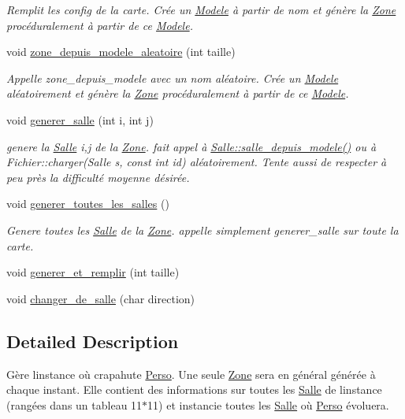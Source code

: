 \begin{DoxyCompactItemize}
\begin{DoxyCompactList}\small\item\em Remplit les {\itshape config} de la {\itshape carte}. Crée un \hyperlink{classModele}{Modele} à partir de {\itshape nom} et génère la \hyperlink{classZone}{Zone} procéduralement à partir de ce \hyperlink{classModele}{Modele}. \end{DoxyCompactList}\item 
void \hyperlink{classZone_a64b87f18b343a38b40a2fbf9220b3994}{zone\+\_\+depuis\+\_\+modele\+\_\+aleatoire} (int taille)
\begin{DoxyCompactList}\small\item\em Appelle zone\+\_\+depuis\+\_\+modele avec un nom aléatoire. Crée un \hyperlink{classModele}{Modele} aléatoirement et génère la \hyperlink{classZone}{Zone} procéduralement à partir de ce \hyperlink{classModele}{Modele}. \end{DoxyCompactList}\item 
void \hyperlink{classZone_a2a149ff3989dbe48c1dd1822f158da8e}{generer\+\_\+salle} (int i, int j)
\begin{DoxyCompactList}\small\item\em genere la \hyperlink{classSalle}{Salle} i,j de la \hyperlink{classZone}{Zone}. fait appel à \hyperlink{classSalle_a6eaf8452709243464f7919b53bccc0b3}{Salle\+::salle\+\_\+depuis\+\_\+modele()} ou à Fichier\+::charger(\+Salle s, const int id) aléatoirement. Tente aussi de respecter à peu près la difficulté moyenne désirée. \end{DoxyCompactList}\item 
void \hyperlink{classZone_a91c45becbd6371aecf0b26ee68bb06f5}{generer\+\_\+toutes\+\_\+les\+\_\+salles} ()
\begin{DoxyCompactList}\small\item\em Genere toutes les \hyperlink{classSalle}{Salle} de la \hyperlink{classZone}{Zone}. appelle simplement generer\+\_\+salle sur toute la carte. \end{DoxyCompactList}\item 
void \hyperlink{classZone_a55883c546c6359642a9b50ad4ba48c78}{generer\+\_\+et\+\_\+remplir} (int taille)
\item 
void \hyperlink{classZone_a5563c71779d4c897df21da0f5a01df8d}{changer\+\_\+de\+\_\+salle} (char direction)
\end{DoxyCompactItemize}


\subsection{Detailed Description}
Gère l\textquotesingle{}instance où crapahute \hyperlink{classPerso}{Perso}. Une seule \hyperlink{classZone}{Zone} sera en général générée à chaque instant. Elle contient des informations sur toutes les \hyperlink{classSalle}{Salle} de l\textquotesingle{}instance (rangées dans un tableau 11$\ast$11) et instancie toutes les \hyperlink{classSalle}{Salle} où \hyperlink{classPerso}{Perso} évoluera. 

